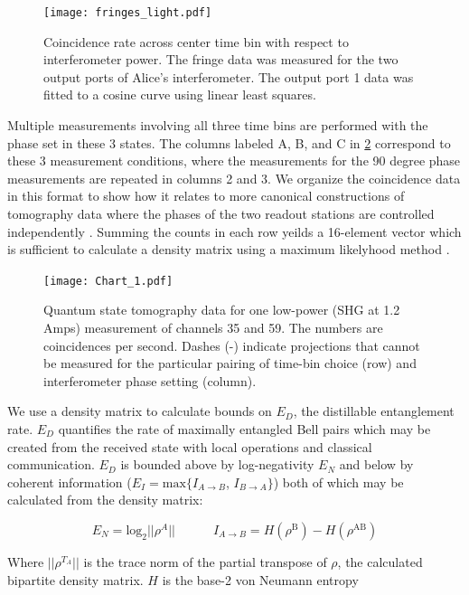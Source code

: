 \documentclass[11pt]{caltech_thesis} %
\begin{document}
\begin{figure}[H]
    \centering
    \texttt{[image: fringes\_light.pdf]}
    \caption{Coincidence rate across center time bin with respect to interferometer power. The fringe data was measured for the two output ports of Alice's interferometer. The output port 1 data was fitted to a cosine curve using linear least squares.}
    \label{fig:fringes}
\end{figure}

Multiple measurements involving all three time bins are performed with the phase set in these 3 states. The columns labeled A, B, and C in \ref{fig:counts_chart} correspond to these 3 measurement conditions, where the measurements for the 90 degree phase measurements are repeated in columns 2 and 3. We organize the coincidence data in this format to show how it relates to more canonical constructions of tomography data where the phases of the two readout stations are controlled independently \cite{Zhang2021Tomography,Takesue09Tomography}. Summing the counts in each row yeilds a 16-element vector which is sufficient to calculate a density matrix using a maximum likelyhood method \cite{tomography2023}.

\begin{figure}[H]
    \centering
    \texttt{[image: Chart\_1.pdf]}
    \caption{Quantum state tomography data for one low-power (SHG at 1.2 Amps) measurement of channels 35 and 59. The numbers are coincidences per second. Dashes (-) indicate projections that cannot be measured for the particular pairing of time-bin choice (row) and interferometer phase setting (column).}
    \label{fig:counts_chart}
\end{figure}

We use a density matrix to calculate bounds on $E_D$, the distillable entanglement rate. $E_D$ quantifies the rate of maximally entangled Bell pairs which may be created from the received state with local operations and classical communication. $E_D$ is bounded above by log-negativity $E_N$ and below by coherent information ($E_I = \mathrm{max}\{I_{A\rightarrow B}$, $I_{B\rightarrow A}\}$) \cite{Alshowkan2022,Eisert2000} both of which may be calculated from the density matrix:

$$E_N = \mathrm{log_2}||\rho^{A}|| \quad\quad\quad I_{A\rightarrow B} = H\left(\rho^\mathrm{B}\right)-H\left(\rho^{\mathrm{AB}}\right)$$

Where $||\rho^{T_A}||$ is the trace norm of the partial transpose of $\rho$, the calculated bipartite density matrix. $H$ is the base-2 von Neumann entropy \cite{Vidal2002negativity, Devetak2004coherent}
\end{document}

